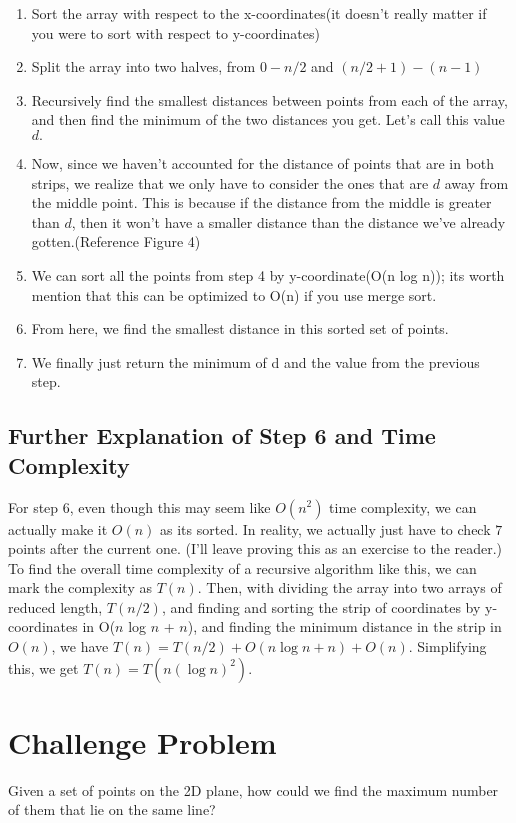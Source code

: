 \documentclass{article}
\begin{document}
\begin{enumerate}
    \item Sort the array with respect to the x-coordinates(it doesn't really matter if you were to sort with respect to y-coordinates)
    \item Split the array into two halves, from $0 - n/2$ and $(n/2 + 1) - (n - 1)$
    \item Recursively find the smallest distances between points from each of the array, and then find the minimum of the two distances you get. Let's call this value $d.$
    \item Now, since we haven't accounted for the distance of points that are in both strips, we realize that we only have to consider the ones that are $d$ away from the middle point. This is because if the distance from the middle is greater than $d$, then it won't have a smaller distance than the distance we've already gotten.(Reference Figure 4)
    \item We can sort all the points from step 4 by y-coordinate(O(n log n)); its worth mention that this can be optimized to O(n) if you use merge sort. 
    \item From here, we find the smallest distance in this sorted set of points.
    \item We finally just return the minimum of d and the value from the previous step.
\end{enumerate}
\subsection{Further Explanation of Step 6 and Time Complexity}
For step 6, even though this may seem like $O(n^2)$ time complexity, we can actually make it $O(n)$ as its sorted. In reality, we actually just have to check $7$ points after the current one. (I'll leave proving this as an exercise to the reader.) To find the overall time complexity of a recursive algorithm like this, we can mark the complexity as $T(n).$ Then, with dividing the array into two arrays of reduced length, $T(n/2)$, and finding and sorting the strip of coordinates by y-coordinates in O($n$ log $n$ + $n$), and finding the minimum distance in the strip in $O(n)$, we have $T(n) = T(n/2) + O(n\log{n} + n) + O(n).$ Simplifying this, we get $T(n) = T(n (\log{n})^2).$

\section{Challenge Problem}
Given a set of points on the 2D plane, how could we find the maximum number of them that lie on the same line?
\end{document}
